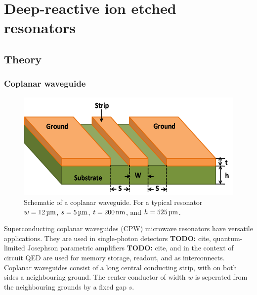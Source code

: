 \label{part:DRIE}












\part{Deep-reactive ion etched resonators\protect{}}
\label{chapter:Resonators}

\chapter{Theory}
  \label{ch:theory}

  \section{Coplanar waveguide}

    \begin{figure}
        \begin{center}
            \includegraphics[width=\textwidth]{Figures/DRIE/CPW.png}
        \end{center}
        \caption{Schematic of a coplanar waveguide. For a typical resonator $w=\text{\ensuremath{\SI{12}{\micro \meter}}}$, $s=\text{\ensuremath{\SI{5}{\micro \meter}}}$, $t=\text{\ensuremath{\SI{200}{\nano \meter}}}$, and $h=\text{\ensuremath{\SI{525}{\micro \meter}}}$.}
        \label{fig:CPW}
    \end{figure}

    Superconducting coplanar waveguides (CPW) microwave resonators have versatile applications. They are used in single-photon detectors \textbf{TODO:} cite, quantum-limited Josephson parametric amplifiers \textbf{TODO:} cite, and in the context of circuit QED are used for memory storage, readout, and as interconnects. Coplanar waveguides consist of a long central conducting strip, with on both sides a neighbouring ground. The center conductor of width $w$ is seperated from the neighbouring grounds by a fixed gap $s$.

